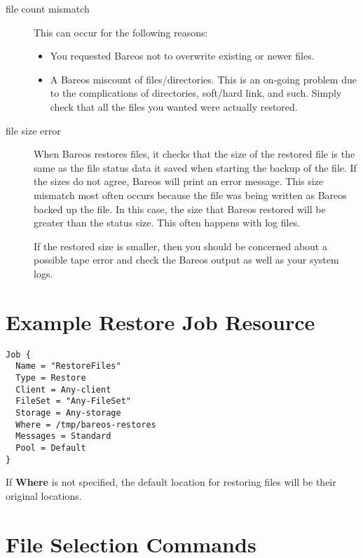 \begin{description}

\item [file count mismatch]
  This can occur for the following reasons:
  \begin{itemize}
  \item You requested Bareos not to overwrite existing or newer
     files.
  \item A Bareos miscount of files/directories. This is an
     on-going problem due to the complications of directories,
     soft/hard link, and such.  Simply check that all the files you
     wanted were actually restored.
  \end{itemize}

\item [file size error]
   When Bareos restores files, it checks that the size of the
   restored file is the same as the file status data it saved
   when starting the backup of the file. If the sizes do not
   agree, Bareos will print an error message. This size mismatch
   most often occurs because the file was being written as Bareos
   backed up the file. In this case, the size that Bareos
   restored will be greater than the status size.  This often
   happens with log files.

   If the restored size is smaller, then you should be concerned
   about a possible tape error and check the Bareos output as
   well as your system logs.
\end{description}



\section{Example Restore Job Resource}

\footnotesize
\begin{verbatim}
Job {
  Name = "RestoreFiles"
  Type = Restore
  Client = Any-client
  FileSet = "Any-FileSet"
  Storage = Any-storage
  Where = /tmp/bareos-restores
  Messages = Standard
  Pool = Default
}
\end{verbatim}
\normalsize

If {\bf Where} is not specified, the default location for restoring files will
be their original locations.
\label{Selection}

\section{File Selection Commands}

